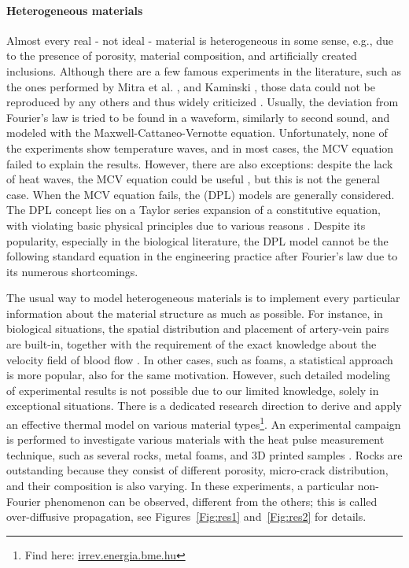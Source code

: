 \documentclass[sn-mathphys]{sn-jnl}%
\theoremstyle{thmstyleone}%
\theoremstyle{thmstyletwo}%
\theoremstyle{thmstylethree}%
\begin{document}
{\paragraph{Heterogeneous materials}
Almost every real - not ideal - material is heterogeneous in some sense, e.g., due to the presence of porosity, material composition, and artificially created inclusions. Although there are a few famous experiments in the literature, such as the ones performed by Mitra et al. \cite{MitEta95}, and Kaminski \cite{Kam90}, those data could not be reproduced by any others and thus widely criticized \cite{Ant05meat, GraPet99, HerBec00, HerBec00b, BriZha09}. Usually, the deviation from Fourier's law is tried to be found in a waveform, similarly to second sound, and modeled with the Maxwell-Cattaneo-Vernotte equation. Unfortunately, none of the experiments show temperature waves, and in most cases, the MCV equation failed to explain the results. However, there are also exceptions: despite the lack of heat waves, the MCV equation could be useful \cite{Jiang03, Banetal05}, but this is not the general case. When the MCV equation fails, the (DPL) models are generally considered. The DPL concept lies on a Taylor series expansion of a constitutive equation, with violating basic physical principles due to various reasons \cite{FabEtal16, Ruk14a, Ruk17a, RukSam13a, FabLaz14a, FabFra14a, Quin07, DreEta09a, KovVan18a1}. Despite its popularity, especially in the biological literature, the DPL model cannot be the following standard equation in the engineering practice after Fourier's law due to its numerous shortcomings. 

The usual way to model heterogeneous materials is to implement every particular information about the material structure as much as possible. For instance, in biological situations, the spatial distribution and placement of artery-vein pairs are built-in, together with the requirement of the exact knowledge about the velocity field of blood flow \cite{ChenHolm80, WJL84, Jiji09b, WJ85, Wulff74}. In other cases, such as foams, a statistical approach is more popular, also for the same motivation. However, such detailed modeling of experimental results is not possible due to our limited knowledge, solely in exceptional situations. There is a dedicated research direction to derive and apply an effective thermal model on various material types\footnote{Find here: \url{irrev.energia.bme.hu}}. An experimental campaign is performed to investigate various materials with the heat pulse measurement technique, such as several rocks, metal foams, and 3D printed samples \cite{Botetal16, Vanetal17, FulEtal18e, FehEtal21, FehKov21}. Rocks are outstanding because they consist of different porosity, micro-crack distribution, and their composition is also varying. In these experiments, a particular non-Fourier phenomenon can be observed, different from the others; this is called over-diffusive propagation, see Figures~\ref{Fig:res1} and~\ref{Fig:res2} for details.

}
\end{document}
